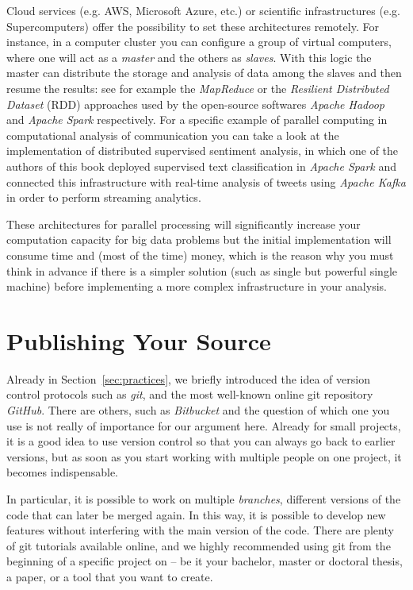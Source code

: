Cloud services (e.g. AWS, Microsoft Azure, etc.) or scientific infrastructures (e.g. Supercomputers) offer the possibility to set these architectures remotely. For instance, in a computer cluster you can configure a group of virtual computers, where one will act as a \textit{master} and the others as \textit{slaves}. With this logic the master can distribute the storage and analysis of data among the slaves and then resume the results: see for example the \textit{MapReduce} or the \textit{Resilient Distributed Dataset} (RDD) approaches used by the open-source softwares \textit{Apache Hadoop} and \textit{Apache Spark} respectively.  For a specific example of parallel computing in computational analysis of communication you can take a look at the implementation of distributed supervised sentiment analysis,  in which one of the authors of this book deployed supervised text classification in \textit{Apache Spark}  and connected this infrastructure with real-time analysis of tweets using \textit{Apache Kafka}  in order to perform streaming analytics\cite[see][]{calderon2019distributed}.

These architectures for parallel processing will significantly increase your computation capacity for big data problems but the initial implementation will consume time and (most of the time) money, which is the reason why you must think in advance if there is a simpler solution (such as single but powerful single machine) before implementing a more complex infrastructure in your analysis.

%

\section{Publishing Your Source}
\label{sec:publishingsource}

Already in Section~\ref{sec:practices}, we briefly introduced the idea of
version control protocols such as \emph{git}, and the most well-known
online git repository \emph{GitHub}.
There are others, such as \emph{Bitbucket}
and the question of which one you use is not really of importance for our
argument here. Already for small projects, it is a good idea to use
version control so that you can always go back to earlier versions,
but as soon as you start working with multiple people on one project,
it becomes indispensable.

In particular, it is possible to work on multiple \emph{branches},
different versions of the code that can later be merged again. In this
way, it is possible to develop new features without interfering with
the main version of the code. There are plenty of git tutorials
available online, and we highly recommended using git from the
beginning of a specific project on -- be it your bachelor, master or doctoral thesis, a paper, or a tool that you want to create.

